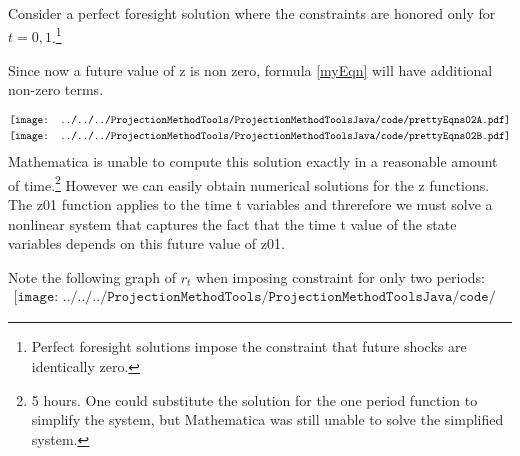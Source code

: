 
Consider a perfect foresight solution where the constraints are honored only 
for $t=0,1$.\footnote{ Perfect foresight solutions impose the constraint that future shocks are identically zero.}

Since now a future value of z is non zero, formula \ref{myEqn}  will have additional non-zero terms.


\begin{gather*}
  \vcenter{\hbox{\texttt{[image: ../../../ProjectionMethodTools/ProjectionMethodToolsJava/code/prettyEqns02A.pdf]}}}\\
  \vcenter{\hbox{\texttt{[image: ../../../ProjectionMethodTools/ProjectionMethodToolsJava/code/prettyEqns02B.pdf]}}}\\
\end{gather*}
Mathematica is unable to compute this solution exactly in a reasonable amount
of time.\footnote{ 5 hours.  One could substitute the solution for the one period function to simplify the system, but Mathematica was still unable to solve the simplified system.}  However we can easily obtain numerical solutions for the z functions.  The z01 function applies to the time t variables and 
threrefore we must solve a nonlinear system that captures the fact that
the time t value of the state variables depends on this future value of z01.


Note the following graph of $r_t$ when imposing constraint for only two periods:
\begin{gather*}
\texttt{[image: ../../../ProjectionMethodTools/ProjectionMethodToolsJava/code/prettyrr02.pdf]}
\end{gather*}



\newcommand{\lucaXt}{
   \begin{bmatrix}
    q_{t-1}\\r_{ut-1}\\r_{t-1}\\
     q_{t}\\r_{ut}\\r_{t}\\
     q_{t+1}\\r_{ut+1}\\r_{t+1}
   \end{bmatrix}}

 \newcommand{\lucaXtpOne}{
   \begin{bmatrix}
     q_{t}\\r_{ut}\\r_{t}\\
     q_{t+1}\\r_{ut+1}\\r_{t+1}\\
     q_{t+2}\\r_{ut+2}\\r_{t+2}
   \end{bmatrix}}


